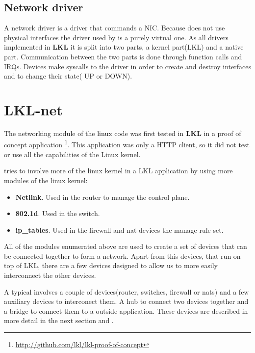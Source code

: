 \subsection{Network driver}
\label{sub-sec:net-driver}

A network driver is a driver that commands a NIC. Because 
\textbf{\project} does not use physical interfaces
the driver used by \textbf{\project} is a purely virtual 
one. As all drivers implemented in \textbf{LKL} 
it is split into two parts, a kernel part(LKL) and 
a native part. Communication between the two parts
is done through function calls and IRQs.
Devices make syscalls to the driver in order to create and
destroy interfaces and to change their state( UP or DOWN).

\section{LKL-net}
\label{sec:lkl-net}

The networking module of the linux code was first tested in \textbf{LKL} in a proof of concept application
\footnote{\url{http://github.com/lkl/lkl-proof-of-concept}}. This application was only a HTTP client, so
it did not test or use all the capabilities of the Linux kernel.

\textbf{\project} tries to involve more of the linux kernel in a LKL application by using more modules
of the linux kernel:
\begin{itemize}
  \item \textbf{Netlink}. Used in the router to manage the control plane.
  \item \textbf{802.1d}. Used in the switch.
  \item \textbf{ip_tables}. Used in the firewall and nat devices the manage rule set.
\end{itemize}

All of the modules enumerated above are used to create a set of devices that can be connected together
to form a network. Apart from this devices, that run on top of LKL, there are a few devices designed
to allow us to more easily interconnect the other devices.

A typical \textbf{\project} involves a couple of devices(router, switches, firewall or nats) and a few
auxiliary devices to interconect them. A hub to connect two devices together and a bridge to connect them to
a outside application. These devices are described in more detail in the next section and .

